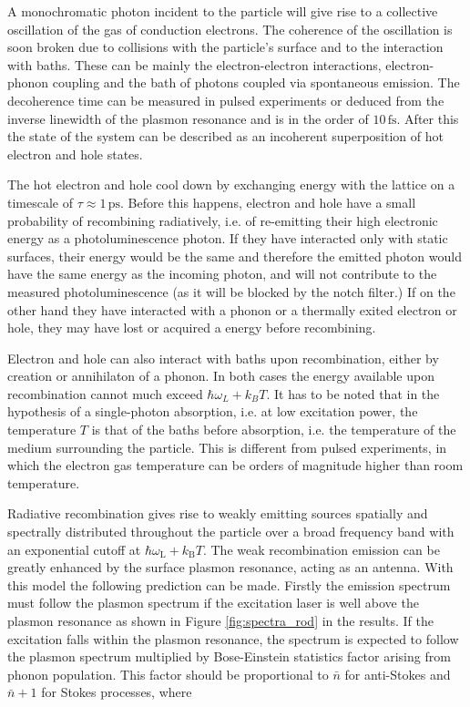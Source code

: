 \documentclass[journal=nalefd,manuscript=letter]{achemso}
\newcommand{\fs}{\ensuremath{\,\textrm{fs}}}
\newcommand{\ps}{\ensuremath{\,\textrm{ps}}}
\begin{document}
A monochromatic photon incident to the particle will give rise to a collective
oscillation of the gas of conduction electrons. The coherence of the oscillation
is soon broken due to collisions with the particle's surface and to the
interaction with baths\cite{Zhao2016,Sonnichsen2002}. These can be mainly the
electron-electron interactions, electron-phonon coupling and the bath of photons
coupled via spontaneous emission. The decoherence time can be measured in pulsed
experiments or deduced from the inverse linewidth of the plasmon resonance and
is in the order of $10\fs$\cite{Sonnichsen2002}. After this the state of the
system can be described as an incoherent superposition of hot electron and hole
states.

The hot electron and hole cool down by exchanging energy with the lattice on a
timescale of $\tau\approx1\ps$\cite{Pustovalov2005}. Before this happens,
electron and hole have a small probability of recombining radiatively, i.e. of 
re-emitting their high electronic energy as a photoluminescence photon. If they
have interacted only with static surfaces, their energy would be the same and
therefore the emitted photon would have the same energy as the incoming
photon, and will not contribute to the measured photoluminescence (as it will be
blocked by the notch filter.) If on the other hand they have interacted with a
phonon or a thermally exited electron or hole, they may have lost or acquired a
energy before recombining.

Electron and hole can also interact with baths upon recombination, either by
creation or annihilaton of a phonon. In both cases the energy available upon
recombination cannot much exceed $\hbar\omega_L+k_BT$. It has to be noted that
in the hypothesis of a single-photon absorption, i.e. at low excitation power, the
temperature $T$ is that of the baths before absorption, i.e. the temperature of
the medium surrounding the particle. This is different from pulsed experiments,
in which the electron gas temperature can be orders of magnitude higher than
room temperature\cite{Baffou2013a}. 

Radiative recombination gives rise to weakly emitting sources spatially and
spectrally distributed throughout the particle over a broad frequency band with
an exponential cutoff at $\hbar\omega_\textrm{L}+k_\textrm{B}T$. The weak
recombination emission can be greatly enhanced by the surface plasmon resonance,
acting as an antenna. With this model the following prediction can be made.
Firstly the emission spectrum must follow the plasmon spectrum if the excitation
laser is well above the plasmon resonance as shown in Figure
\ref{fig:spectra_rod} in the results. If the excitation falls within the
plasmon resonance, the spectrum is expected to follow the plasmon spectrum multiplied by
Bose-Einstein statistics factor arising from phonon population.
This factor should be proportional to $\bar{n}$ for anti-Stokes and $\bar{n}+1$
for Stokes processes, where
\end{document}
